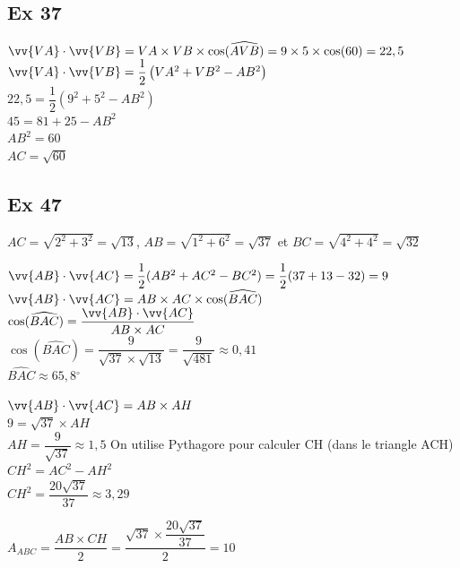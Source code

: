 \documentclass[12pt,a4paper]{book}
\newcommand{\degreees}{\ensuremath{^\circ}}
\begin{document}
\subsection*{Ex 37}
$\vv{VA}\cdot\vv{VB}=VA\times VB\times\cos(\widehat{AVB})=9\times5\times\cos(60)=22,5$\\
$\vv{VA} \cdot \vv{VB}=\dfrac{1}{2}\left(VA^{2}+VB^{2}-AB^{2}\right)$\\
$22,5=\dfrac{1}{2}\left(9^{2}+5^{2}-AB^{2}\right)$\\
$45=81+25-AB^2$\\
$AB^2=60$\\
$AC=\sqrt{60}$

\subsection*{Ex 47}
\begin{enumMet}
    \item
    \begin{enumMet}
        \item $AC=\sqrt{2^2+3^2}=\sqrt{13}$, $AB=\sqrt{1^2+6^2}=\sqrt{37}$ et $BC=\sqrt{4^2+4^2}=\sqrt{32}$
        \item $\vv{AB}\cdot\vv{AC}=\dfrac{1}{2}(AB^2+AC^2-BC^2)=\dfrac{1}{2}(37+13-32)=9$\\
        $\vv{AB}\cdot\vv{AC}=AB\times AC\times\cos(\widehat{BAC})$\\
        $\cos(\widehat{BAC})=\dfrac{\vv{AB}\cdot\vv{AC}}{AB\times AC}$\\
        $\cos(\widehat{BAC})=\dfrac{9}{\sqrt{37}\times \sqrt{13}}=\dfrac{9}{\sqrt{481}}\approx0,41$\\
        $\widehat{BAC}\approx65,8\degreees$
    \end{enumMet}
    \item 
    \begin{enumMet}
        \item $\vv{AB}\cdot\vv{AC}=AB\times AH$\\
        $9=\sqrt{37}\times AH$\\
        $AH=\dfrac{9}{\sqrt{37}}\approx1,5$
        On utilise Pythagore pour calculer CH (dans le triangle ACH)\\
        $CH^2=AC^2-AH^2$\\
        $CH^2=\dfrac{20\sqrt{37}}{37}\approx3,29$
        \item $A_{ABC}=\dfrac{AB\times CH}{2}=\dfrac{\sqrt{37}\times\dfrac{20\sqrt{37}}{37}}{2}=10$
    \end{enumMet}
\end{enumMet}
\end{document}
